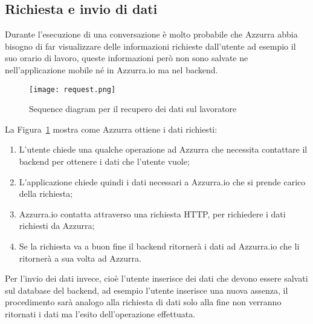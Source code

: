 \subsection{Richiesta e invio di dati}
Durante l'esecuzione di una conversazione è molto probabile che Azzurra abbia bisogno di far visualizzare delle informazioni richieste dall'utente ad esempio il suo orario di lavoro, queste informazioni però non sono salvate ne nell'applicazione mobile né in Azzurra.io ma nel backend.
\begin{figure}[h]
	\begin{center}
		\texttt{[image: request.png]}
		\caption{Sequence diagram per il recupero dei dati sul lavoratore}\label{fig:request}
	\end{center}
\end{figure}
La Figura~\ref{fig:request} mostra come Azzurra ottiene i dati richiesti:
\begin{enumerate}
	\item L'utente chiede una qualche operazione ad Azzurra che necessita contattare il backend per ottenere i dati che l'utente vuole;
	\item L'applicazione chiede quindi i dati necessari a Azzurra.io che si prende carico della richiesta;
	\item Azzurra.io contatta attraverso una richiesta HTTP, per richiedere i dati richiesti da Azzurra;
	\item Se la richiesta va a buon fine il backend ritornerà i dati ad Azzurra.io che li ritornerà a sua volta ad Azzurra.
\end{enumerate}

Per l'invio dei dati invece, cioè l'utente inserisce dei dati che devono essere salvati sul database del backend, ad esempio l'utente inserisce una nuova assenza, il procedimento sarà analogo alla richiesta di dati solo alla fine non verranno ritornati i dati ma l'esito dell'operazione effettuata.
